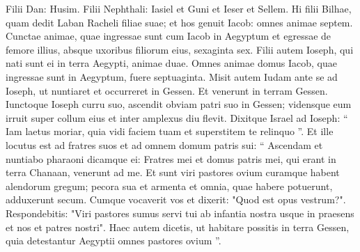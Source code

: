 \begin{biblechapter}
\begin{biblechapter}
\begin{biblechapter}
\begin{biblechapter}
\begin{biblechapter}
\begin{biblechapter}
\begin{biblechapter}
\begin{biblechapter}
\begin{biblechapter}
\begin{biblechapter}
\begin{biblechapter}
\begin{biblechapter}
\begin{biblechapter}
\begin{biblechapter}
\begin{biblechapter}
\begin{biblechapter}
\begin{biblechapter}
\begin{biblechapter}
\begin{biblechapter}
\begin{biblechapter}
\begin{biblechapter}
\begin{biblechapter}
\begin{biblechapter}
\begin{biblechapter}
\begin{biblechapter}
\begin{biblechapter}
\begin{biblechapter}
\begin{biblechapter}
\begin{biblechapter}
\begin{biblechapter}
\begin{biblechapter}
\begin{biblechapter}
\begin{biblechapter}
\begin{biblechapter}
\begin{biblechapter}
\begin{biblechapter}
\begin{biblechapter}
\begin{biblechapter}
\begin{biblechapter}
\begin{biblechapter}
\begin{biblechapter}
\begin{biblechapter}
\begin{biblechapter}
\begin{biblechapter}
\begin{biblechapter}
\begin{biblechapter}
 \verse Filii Dan: Husim.
 \verse Filii Nephthali: Iasiel et Guni et Ieser et Sellem.
 \verse Hi filii Bilhae, quam dedit Laban Racheli filiae suae; et hos genuit Iacob: omnes animae septem.
 \verse Cunctae animae, quae ingressae sunt cum Iacob in Aegyptum et egressae de femore illius, absque uxoribus filiorum eius, sexaginta sex. 
\verse Filii autem Ioseph, qui nati sunt ei in terra Aegypti, animae duae. Omnes animae domus Iacob, quae ingressae sunt in Aegyptum, fuere septuaginta.
 \verse Misit autem Iudam ante se ad Ioseph, ut nuntiaret et occurreret in Gessen. 
 \verse Et venerunt in terram Gessen. Iunctoque Ioseph curru suo, ascendit obviam patri suo in Gessen; vidensque eum irruit super collum eius et inter amplexus diu flevit. 
\verse Dixitque Israel ad Ioseph: “ Iam laetus moriar, quia vidi faciem tuam et superstitem te relinquo ”.
 \verse Et ille locutus est ad fratres suos et ad omnem domum patris sui: “ Ascendam et nuntiabo pharaoni dicamque ei: Fratres mei et domus patris mei, qui erant in terra Chanaan, venerunt ad me. 
\verse Et sunt viri pastores ovium curamque habent alendorum gregum; pecora sua et armenta et omnia, quae habere potuerunt, adduxerunt secum. 
\verse Cumque vocaverit vos et dixerit: "Quod est opus vestrum?". 
\verse Respondebitis: "Viri pastores sumus servi tui ab infantia nostra usque in praesens et nos et patres nostri". Haec autem dicetis, ut habitare possitis in terra Gessen, quia detestantur Aegyptii omnes pastores ovium ”.
 

\end{biblechapter}
\end{biblechapter}
\end{biblechapter}
\end{biblechapter}
\end{biblechapter}
\end{biblechapter}
\end{biblechapter}
\end{biblechapter}
\end{biblechapter}
\end{biblechapter}
\end{biblechapter}
\end{biblechapter}
\end{biblechapter}
\end{biblechapter}
\end{biblechapter}
\end{biblechapter}
\end{biblechapter}
\end{biblechapter}
\end{biblechapter}
\end{biblechapter}
\end{biblechapter}
\end{biblechapter}
\end{biblechapter}
\end{biblechapter}
\end{biblechapter}
\end{biblechapter}
\end{biblechapter}
\end{biblechapter}
\end{biblechapter}
\end{biblechapter}
\end{biblechapter}
\end{biblechapter}
\end{biblechapter}
\end{biblechapter}
\end{biblechapter}
\end{biblechapter}
\end{biblechapter}
\end{biblechapter}
\end{biblechapter}
\end{biblechapter}
\end{biblechapter}
\end{biblechapter}
\end{biblechapter}
\end{biblechapter}
\end{biblechapter}
\end{biblechapter}
